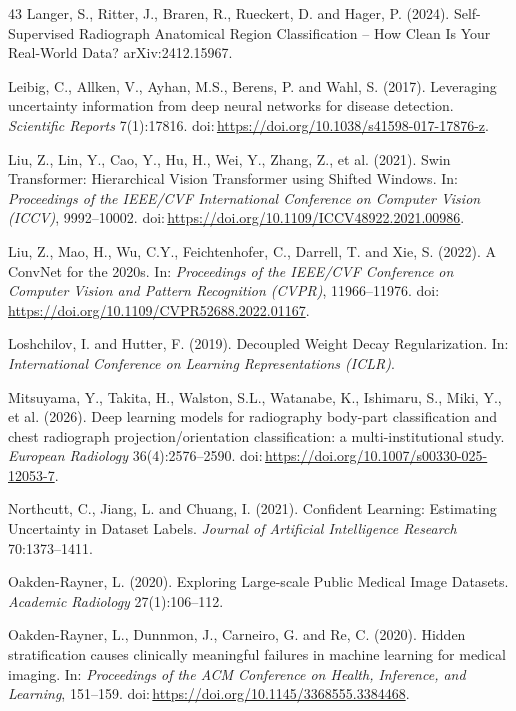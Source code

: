 \begin{thebibliography}{43}
Langer, S., Ritter, J., Braren, R., Rueckert, D. and Hager, P. (2024). Self-Supervised Radiograph Anatomical Region Classification -- How Clean Is Your Real-World Data? arXiv:2412.15967.

Leibig, C., Allken, V., Ayhan, M.S., Berens, P. and Wahl, S. (2017). Leveraging uncertainty information from deep neural networks for disease detection. \textit{Scientific Reports} 7(1):17816. doi:\,\url{https://doi.org/10.1038/s41598-017-17876-z}.

Liu, Z., Lin, Y., Cao, Y., Hu, H., Wei, Y., Zhang, Z., et al. (2021). Swin Transformer: Hierarchical Vision Transformer using Shifted Windows. In: \textit{Proceedings of the IEEE/CVF International Conference on Computer Vision (ICCV)}, 9992--10002. doi:\,\url{https://doi.org/10.1109/ICCV48922.2021.00986}.

Liu, Z., Mao, H., Wu, C.Y., Feichtenhofer, C., Darrell, T. and Xie, S. (2022). A ConvNet for the 2020s. In: \textit{Proceedings of the IEEE/CVF Conference on Computer Vision and Pattern Recognition (CVPR)}, 11966--11976. doi:\,\url{https://doi.org/10.1109/CVPR52688.2022.01167}.

Loshchilov, I. and Hutter, F. (2019). Decoupled Weight Decay Regularization. In: \textit{International Conference on Learning Representations (ICLR)}.

Mitsuyama, Y., Takita, H., Walston, S.L., Watanabe, K., Ishimaru, S., Miki, Y., et al. (2026). Deep learning models for radiography body-part classification and chest radiograph projection/orientation classification: a multi-institutional study. \textit{European Radiology} 36(4):2576--2590. doi:\,\url{https://doi.org/10.1007/s00330-025-12053-7}.

Northcutt, C., Jiang, L. and Chuang, I. (2021). Confident Learning: Estimating Uncertainty in Dataset Labels. \textit{Journal of Artificial Intelligence Research} 70:1373--1411.

Oakden-Rayner, L. (2020). Exploring Large-scale Public Medical Image Datasets. \textit{Academic Radiology} 27(1):106--112.

Oakden-Rayner, L., Dunnmon, J., Carneiro, G. and Re, C. (2020). Hidden stratification causes clinically meaningful failures in machine learning for medical imaging. In: \textit{Proceedings of the ACM Conference on Health, Inference, and Learning}, 151--159. doi:\,\url{https://doi.org/10.1145/3368555.3384468}.


\end{thebibliography}
